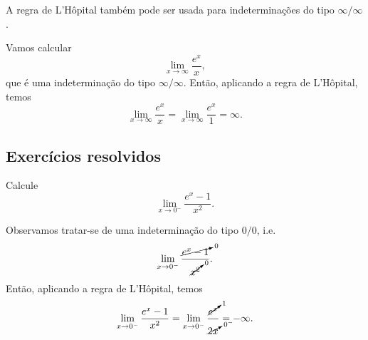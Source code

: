 \begin{obs}
  A regra de L'Hôpital também pode ser usada para indeterminações do tipo $\infty/\infty$.
\end{obs}

\begin{ex}
  Vamos calcular
  \begin{equation}
    \lim_{x\to \infty} \frac{e^x}{x},
  \end{equation}
  que é uma indeterminação do tipo $\infty/\infty$. Então, aplicando a regra de L'Hôpital, temos
  \begin{equation}
    \lim_{x\to \infty} \frac{e^x}{x} = \lim_{x\to \infty} \frac{e^x}{1} = \infty.
  \end{equation}
\end{ex}

\subsection{Exercícios resolvidos}


\begin{exeresol}
  Calcule
  \begin{equation}
    \lim_{x\to 0^-} \frac{e^x-1}{x^2}.
  \end{equation}
\end{exeresol}
\begin{resol}
  Observamos tratar-se de uma indeterminação do tipo $0/0$, i.e.
  \begin{equation}
    \lim_{x\to 0^-} \frac{\cancelto{0}{e^x-1}}{\cancelto{0}{x^2}}.
  \end{equation}
  Então, aplicando a regra de L'Hôpital, temos
  \begin{equation}
    \lim_{x\to 0^-} \frac{e^x-1}{x^2} = \lim_{x\to 0^-} \frac{\cancelto{1}{e^x}}{\cancelto{0^-}{2x}} = -\infty.
  \end{equation}
\end{resol}

